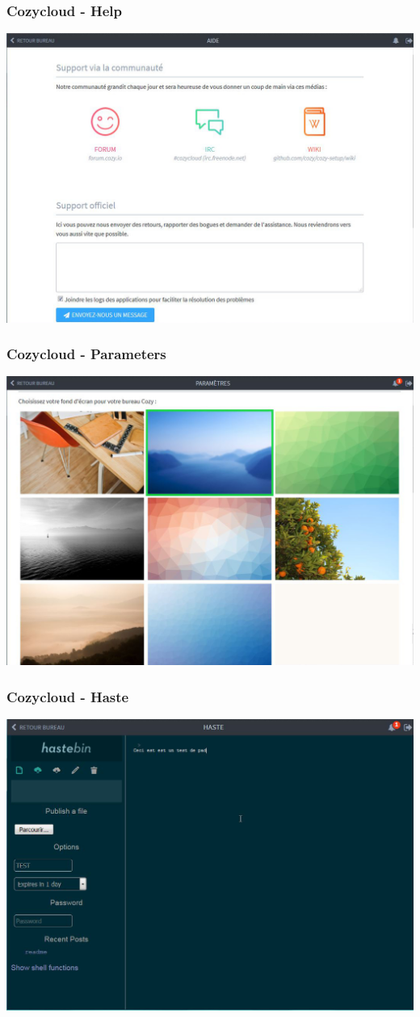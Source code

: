 \documentclass{beamer}
\begin{document}
\begin{frame}
\frametitle{Cozycloud - Help}
\includegraphics[scale=0.3] {./CozyCloud/CozyCloud_Aide.jpg}
\end{frame}

\begin{frame}
\frametitle{Cozycloud - Parameters}
\includegraphics[scale=0.3] {./CozyCloud/CozyCloud_Parametres.jpg}
\end{frame}

\begin{frame}
\frametitle{Cozycloud - Haste}
\includegraphics[scale=0.3] {./CozyCloud/CozyCloud_Haste.jpg}
\end{frame}
\end{document}
